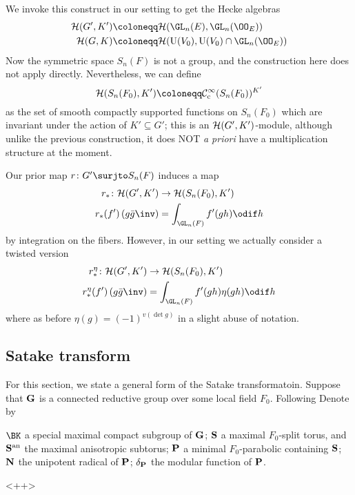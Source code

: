 We invoke this construct in our setting to get the Hecke algebras
\begin{align*}
  \HH(G', K') &\coloneqq \HH(\GL_n(E), \GL_n(\OO_E)) \\
  \HH(G, K) &\coloneqq \HH(\U(V_0), \U(V_0) \cap \GL_n(\OO_E))
\end{align*}
Now the symmetric space $S_n(F)$ is not a group,
and the construction here does not apply directly.
Nevertheless, we can define
\[ \HH(S_n(F_0), K') \coloneqq \mathcal C_{\mathrm{c}}^{\infty}(S_n(F_0))^{K'} \]
as the set of smooth compactly supported functions on $S_n(F_0)$
which are invariant under the action of $K' \subseteq G'$;
this is an $\mathcal H(G', K')$-module,
although unlike the previous construction, it does NOT \emph{a priori}
have a multiplication structure at the moment.

Our prior map $r \colon G' \surjto S_n(F)$ induces a map
\begin{align*}
  r_\ast \colon \HH(G', K') &\to \HH(S_n(F_0), K') \\
  r_\ast(f')\left( g\bar{g}\inv \right) &= \int_{\GL_n(F)} f'(gh) \odif h
\end{align*}
by integration on the fibers.
However, in our setting we actually consider a twisted version
\begin{align*}
  r_\ast^\eta \colon \HH(G', K') &\to \HH(S_n(F_0), K') \\
  r_\ast^\eta(f')\left( g\bar{g}\inv \right) &= \int_{\GL_n(F)} f'(gh) \eta(gh) \odif h
\end{align*}
where as before $\eta(g) = (-1)^{v(\det g)}$ in a slight abuse of notation.

\subsection{Satake transform}
For this section, we state a general form of the Satake transformatoin.
Suppose that $\mathbf{G}$ is a connected reductive group over some local field $F_0$.
Following
Denote by
\begin{itemize}
  \ii $\BK$ a special maximal compact subgroup of $\mathbf{G}$;
  \ii $\mathbf{S}$ a maximal $F_0$-split torus,
  and $\mathbf{S}^{\text{an}}$ the maximal anisotropic subtorus;
  \ii $\mathbf{P}$ a minimal $F_0$-parabolic containing $\mathbf{S}$;
  \ii $\mathbf{N}$ the unipotent radical of $\mathbf{P}$;
  \ii $\delta_{\mathbf{P}}$ the modular function of $\mathbf{P}$.
\end{itemize}
<++>
